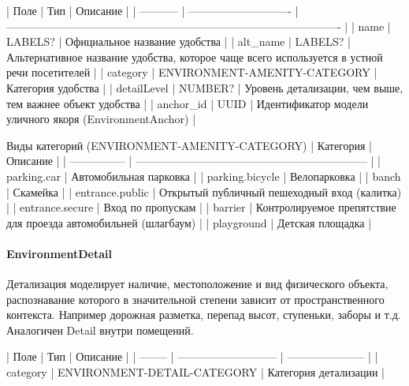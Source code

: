         | Поле        | Тип                          | Описание                                                                                    |
        | ----------- | ---------------------------- | ------------------------------------------------------------------------------------------- |
        | name        | LABELS?                      | Официальное название удобства                                                               |
        | alt\_name    | LABELS?                      | Альтернативное название удобства, которое чаще всего используется в устной речи посетителей |
        | category    | ENVIRONMENT-AMENITY-CATEGORY | Категория удобства                                                                          |
        | detailLevel | NUMBER?                      | Уровень детализации, чем выше, тем важнее объект удобства                                   |
        | anchor\_id   | UUID                         | Идентификатор модели уличного якоря (EnvironmentAnchor)                                     |

        Виды категорий (ENVIRONMENT-AMENITY-CATEGORY)
        | Категория       | Описание                                                        |
        | --------------- | --------------------------------------------------------------- |
        | parking.car     | Автомобильная парковка                                          |
        | parking.bicycle | Велопарковка                                                    |
        | banch           | Скамейка                                                        |
        | entrance.public | Открытый публичный пешеходный вход (калитка)                    |
        | entrance.secure | Вход по пропускам                                               |
        | barrier         | Контролируемое препятствие для проезда автомобильней (шлагбаум) |
        | playground      | Детская площадка                                                |

      \paragraph{EnvironmentDetail}
        Детализация моделирует наличие, местоположение и вид физического объекта, распознавание которого в значительной степени зависит от пространственного контекста. Например дорожная разметка, перепад высот, ступеньки, заборы и т.д. Аналогичен Detail внутри помещений.

        | Поле     | Тип                         | Описание              |
        | -------- | --------------------------- | --------------------- |
        | category | ENVIRONMENT-DETAIL-CATEGORY | Категория детализации |

